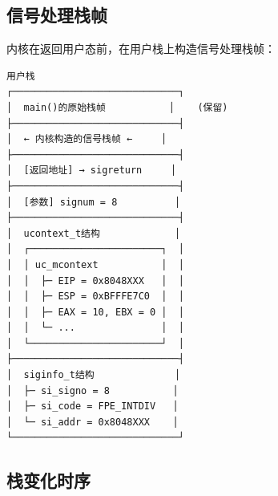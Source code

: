 \documentclass[UTF8,a4paper,12pt]{ctexart}
\begin{document}
\subsection{信号处理栈帧}

内核在返回用户态前，在用户栈上构造信号处理栈帧：

\begin{lstlisting}[style=cstyle,caption={用户栈（信号处理）}]
用户栈
┌─────────────────────────────┐
│  main()的原始栈帧           │    (保留)
├─────────────────────────────┤
│  ← 内核构造的信号栈帧 ←     │
├─────────────────────────────┤
│  [返回地址] → sigreturn     │
├─────────────────────────────┤
│  [参数] signum = 8          │
├─────────────────────────────┤
│  ucontext_t结构             │
│  ┌───────────────────────┐  │
│  │ uc_mcontext           │  │
│  │  ├─ EIP = 0x8048XXX   │  │
│  │  ├─ ESP = 0xBFFFE7C0  │  │
│  │  ├─ EAX = 10, EBX = 0 │  │
│  │  └─ ...               │  │
│  └───────────────────────┘  │
├─────────────────────────────┤
│  siginfo_t结构              │
│  ├─ si_signo = 8           │
│  ├─ si_code = FPE_INTDIV   │
│  └─ si_addr = 0x8048XXX    │
└─────────────────────────────┘
\end{lstlisting}

\subsection{栈变化时序}
\end{document}
